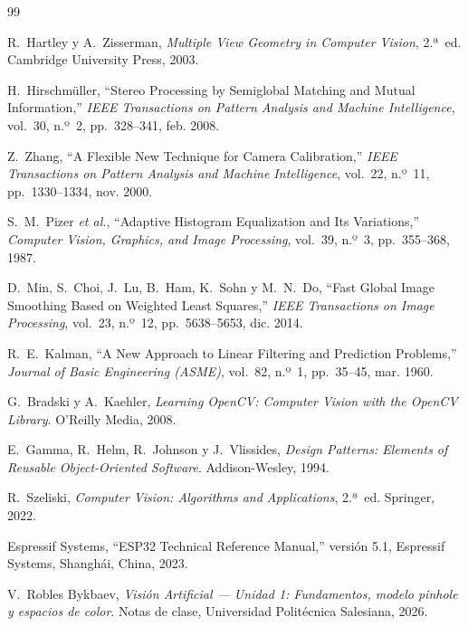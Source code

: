 \documentclass[12pt, a4paper]{article}
\begin{document}
\newpage
\begin{thebibliography}{99}

R.~Hartley y A.~Zisserman,
\textit{Multiple View Geometry in Computer Vision}, 2.ª~ed.
Cambridge University Press, 2003.

H.~Hirschmüller,
``Stereo Processing by Semiglobal Matching and Mutual Information,''
\textit{IEEE Transactions on Pattern Analysis and Machine Intelligence},
vol.~30, n.º~2, pp.~328--341, feb. 2008.

Z.~Zhang,
``A Flexible New Technique for Camera Calibration,''
\textit{IEEE Transactions on Pattern Analysis and Machine Intelligence},
vol.~22, n.º~11, pp.~1330--1334, nov. 2000.

S.~M.~Pizer \textit{et al.},
``Adaptive Histogram Equalization and Its Variations,''
\textit{Computer Vision, Graphics, and Image Processing},
vol.~39, n.º~3, pp.~355--368, 1987.

D.~Min, S.~Choi, J.~Lu, B.~Ham, K.~Sohn y M.~N.~Do,
``Fast Global Image Smoothing Based on Weighted Least Squares,''
\textit{IEEE Transactions on Image Processing},
vol.~23, n.º~12, pp.~5638--5653, dic. 2014.

R.~E.~Kalman,
``A New Approach to Linear Filtering and Prediction Problems,''
\textit{Journal of Basic Engineering (ASME)},
vol.~82, n.º~1, pp.~35--45, mar. 1960.

G.~Bradski y A.~Kaehler,
\textit{Learning OpenCV: Computer Vision with the OpenCV Library}.
O'Reilly Media, 2008.

E.~Gamma, R.~Helm, R.~Johnson y J.~Vlissides,
\textit{Design Patterns: Elements of Reusable Object-Oriented Software}.
Addison-Wesley, 1994.

R.~Szeliski,
\textit{Computer Vision: Algorithms and Applications}, 2.ª~ed.
Springer, 2022.

Espressif Systems,
``ESP32 Technical Reference Manual,'' versión 5.1,
Espressif Systems, Shanghái, China, 2023.

V.~Robles Bykbaev,
\textit{Visión Artificial — Unidad 1: Fundamentos, modelo pinhole y espacios de color}.
Notas de clase, Universidad Politécnica Salesiana, 2026.


\end{thebibliography}
\end{document}

